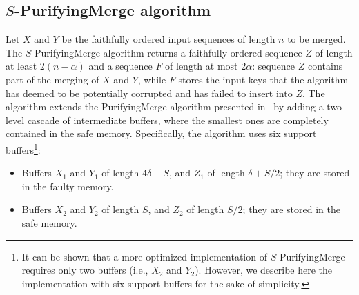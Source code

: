 \documentclass[review,number]{elsarticle}
\newcommand{\X}{{X}}
\newcommand{\Y}{{Y}}
\newcommand{\Z}{{Z}}
\newcommand{\F}{{F}}
\newcommand{\SPurifyingMerge}{$S$-\textsf{PurifyingMerge}}
\newcommand{\PurifyingMerge}{\textsf{PurifyingMerge}}
\begin{document}
\subsection[SPurifyingMerge algorithm]{\SPurifyingMerge{}
algorithm}\label{sec:purify} 
Let $X$ and $Y$ be the faithfully ordered input sequences of length $n$ to be
merged. The \SPurifyingMerge{} algorithm returns a faithfully ordered sequence
$Z$ of length at least $2(n-\alpha)$ and a sequence $\F$ of length at most
$2\alpha$: sequence $Z$ contains part of the merging of $X$ and $Y$, while $F$
stores the input keys that the algorithm has deemed to be potentially corrupted
and has failed to insert into $Z$. The algorithm extends the \PurifyingMerge{}
algorithm presented in~\cite{FGI09} by adding a two-level cascade of
intermediate buffers, where the smallest ones are completely contained in the
safe memory. Specifically, the algorithm uses six support buffers\footnote{It
can be shown that a more optimized implementation of \SPurifyingMerge{} requires
only two buffers (i.e., $\X_2$ and $\Y_2$). However,  we describe here the
implementation with six support buffers for the sake of simplicity.}:
\begin{itemize}
 \item Buffers $\X_1$ and $\Y_1$ of length $4\delta+S$, and $\Z_1$ of length
$\delta+S/2$; they are stored in the faulty memory.
 \item Buffers $\X_2$ and $\Y_2$ of length $S$, and $\Z_2$ of length $S/2$;
they are stored in the safe memory.
\end{itemize}
\end{document}
